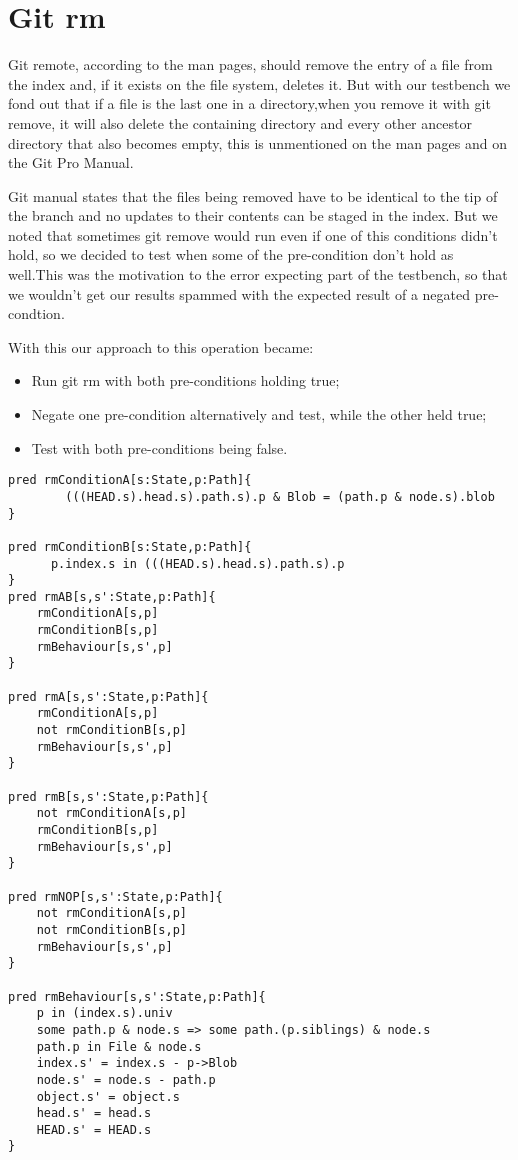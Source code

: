 \section{Git rm}

Git remote, according to the man pages, should remove the entry of a file from the index and, if it exists on the file system, deletes it. But with our testbench we fond out that if a file is the last one in a directory,when you remove it with git remove, it will also delete the containing directory and every other ancestor directory that also becomes empty, this is unmentioned on the man pages and on the Git Pro Manual.


Git manual states that the files being removed have to be identical to the tip of the branch and no updates to their contents can be staged in the index. But we noted that sometimes git remove would run even if one of this conditions didn't hold, so we decided to test when some of the pre-condition don't hold as well.This was the motivation to the error expecting part of the testbench, so that we wouldn't get our results spammed with the expected result of a negated pre-condtion.


With this our approach to this operation became:
\begin{itemize}
\item Run git rm with both pre-conditions holding true;
\item Negate one pre-condition alternatively and test, while the other held true;
\item Test with both pre-conditions being false.
\end{itemize}

\begin{lstlisting}[caption=Predicate rm]
pred rmConditionA[s:State,p:Path]{
		(((HEAD.s).head.s).path.s).p & Blob = (path.p & node.s).blob
}

pred rmConditionB[s:State,p:Path]{
	  p.index.s in (((HEAD.s).head.s).path.s).p 
}
pred rmAB[s,s':State,p:Path]{
	rmConditionA[s,p]
	rmConditionB[s,p]
	rmBehaviour[s,s',p]
}

pred rmA[s,s':State,p:Path]{
	rmConditionA[s,p]
	not rmConditionB[s,p]
	rmBehaviour[s,s',p]
}

pred rmB[s,s':State,p:Path]{
	not rmConditionA[s,p]
	rmConditionB[s,p]
	rmBehaviour[s,s',p]
}

pred rmNOP[s,s':State,p:Path]{
	not rmConditionA[s,p]
	not rmConditionB[s,p]
	rmBehaviour[s,s',p]
}

pred rmBehaviour[s,s':State,p:Path]{
	p in (index.s).univ
	some path.p & node.s => some path.(p.siblings) & node.s 
	path.p in File & node.s 
	index.s' = index.s - p->Blob
	node.s' = node.s - path.p
	object.s' = object.s
	head.s' = head.s
	HEAD.s' = HEAD.s
}
\end{lstlisting}

